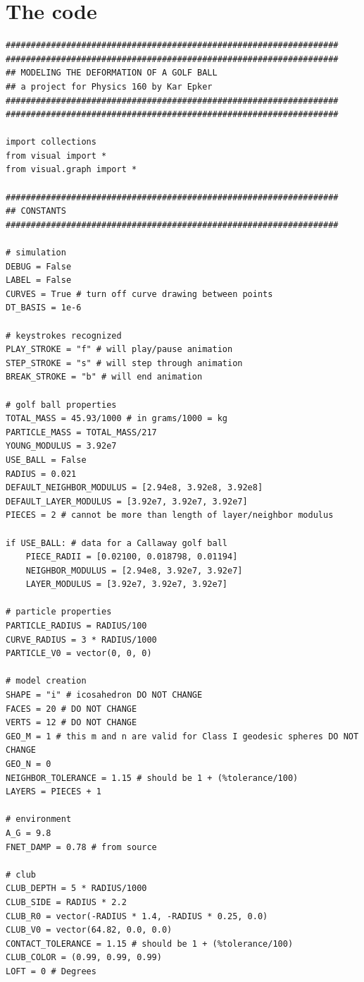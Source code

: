\documentclass{article}
\begin{document}
\section{The code}
\begin{verbatim}
##################################################################
##################################################################
## MODELING THE DEFORMATION OF A GOLF BALL
## a project for Physics 160 by Kar Epker
##################################################################
##################################################################

import collections
from visual import *
from visual.graph import *

##################################################################
## CONSTANTS
##################################################################

# simulation
DEBUG = False
LABEL = False
CURVES = True # turn off curve drawing between points
DT_BASIS = 1e-6

# keystrokes recognized
PLAY_STROKE = "f" # will play/pause animation
STEP_STROKE = "s" # will step through animation
BREAK_STROKE = "b" # will end animation

# golf ball properties
TOTAL_MASS = 45.93/1000 # in grams/1000 = kg
PARTICLE_MASS = TOTAL_MASS/217
YOUNG_MODULUS = 3.92e7
USE_BALL = False
RADIUS = 0.021
DEFAULT_NEIGHBOR_MODULUS = [2.94e8, 3.92e8, 3.92e8]
DEFAULT_LAYER_MODULUS = [3.92e7, 3.92e7, 3.92e7]
PIECES = 2 # cannot be more than length of layer/neighbor modulus

if USE_BALL: # data for a Callaway golf ball
    PIECE_RADII = [0.02100, 0.018798, 0.01194]
    NEIGHBOR_MODULUS = [2.94e8, 3.92e7, 3.92e7]
    LAYER_MODULUS = [3.92e7, 3.92e7, 3.92e7]

# particle properties
PARTICLE_RADIUS = RADIUS/100
CURVE_RADIUS = 3 * RADIUS/1000
PARTICLE_V0 = vector(0, 0, 0)

# model creation
SHAPE = "i" # icosahedron DO NOT CHANGE
FACES = 20 # DO NOT CHANGE
VERTS = 12 # DO NOT CHANGE
GEO_M = 1 # this m and n are valid for Class I geodesic spheres DO NOT CHANGE
GEO_N = 0
NEIGHBOR_TOLERANCE = 1.15 # should be 1 + (%tolerance/100)
LAYERS = PIECES + 1

# environment
A_G = 9.8
FNET_DAMP = 0.78 # from source

# club
CLUB_DEPTH = 5 * RADIUS/1000
CLUB_SIDE = RADIUS * 2.2
CLUB_R0 = vector(-RADIUS * 1.4, -RADIUS * 0.25, 0.0)
CLUB_V0 = vector(64.82, 0.0, 0.0)
CONTACT_TOLERANCE = 1.15 # should be 1 + (%tolerance/100)
CLUB_COLOR = (0.99, 0.99, 0.99)
LOFT = 0 # Degrees


\end{verbatim}
\end{document}
